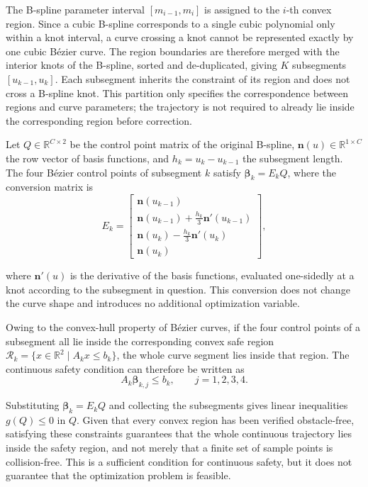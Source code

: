 \documentclass[journal]{IEEEtran}
\newcommand{\R}{\mathbb{R}}
\begin{document}
The B-spline parameter interval $[m_{i-1},m_i]$ is assigned to the $i$-th
convex region. Since a cubic B-spline corresponds to a single cubic polynomial
only within a knot interval, a curve crossing a knot cannot be represented
exactly by one cubic B\'ezier curve. The region boundaries are therefore merged
with the interior knots of the B-spline, sorted and de-duplicated, giving $K$
subsegments $[u_{k-1},u_k]$. Each subsegment inherits the constraint of its
region and does not cross a B-spline knot. This partition only specifies the
correspondence between regions and curve parameters; the trajectory is not
required to already lie inside the corresponding region before correction.

Let $Q\in\R^{C\times2}$ be the control point matrix of the original B-spline,
$\mathbf n(u)\in\R^{1\times C}$ the row vector of basis functions, and
$h_k=u_k-u_{k-1}$ the subsegment length. The four B\'ezier control points of
subsegment $k$ satisfy $\bm\beta_k=E_kQ$, where the conversion matrix is
\begin{equation}
E_k=
\begin{bmatrix}
\mathbf n(u_{k-1})\\[2pt]
\mathbf n(u_{k-1})+\tfrac{h_k}{3}\mathbf n'(u_{k-1})\\[3pt]
\mathbf n(u_k)-\tfrac{h_k}{3}\mathbf n'(u_k)\\[3pt]
\mathbf n(u_k)
\end{bmatrix},
\end{equation}

where $\mathbf n'(u)$ is the derivative of the basis functions, evaluated
one-sidedly at a knot according to the subsegment in question. This conversion
does not change the curve shape and introduces no additional optimization
variable.

Owing to the convex-hull property of B\'ezier curves, if the four control
points of a subsegment all lie inside the corresponding convex safe region
$\mathcal R_k=\{x\in\R^2\mid A_kx\leq b_k\}$, the whole curve segment lies
inside that region. The continuous safety condition can therefore be written as
\begin{equation}
A_k\bm\beta_{k,j}\leq b_k,\qquad j=1,2,3,4.
\end{equation}

Substituting $\bm\beta_k=E_kQ$ and collecting the subsegments gives linear
inequalities $g(Q)\leq0$ in $Q$. Given that every convex region has been
verified obstacle-free, satisfying these constraints guarantees that the whole
continuous trajectory lies inside the safety region, and not merely that a
finite set of sample points is collision-free. This is a sufficient condition
for continuous safety, but it does not guarantee that the optimization problem
is feasible.
\end{document}
